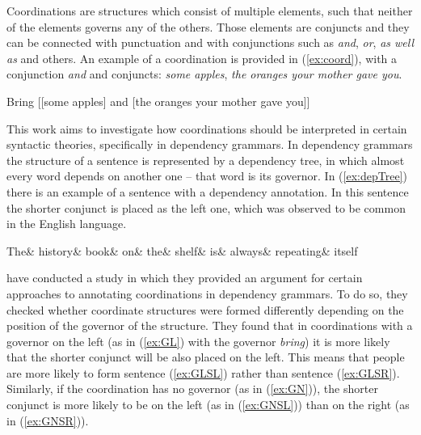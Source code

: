 Coordinations are structures which consist of multiple elements, such that neither of the elements governs any of the others. Those elements are conjuncts and they can be connected with punctuation and with conjunctions such as \textsl{and}, \textsl{or}, \textsl{as well as} and others. An example of a coordination is provided in (\ref{ex:coord}), with a conjunction \textsl{and} and conjuncts: \textsl{some apples}, \textsl{the oranges your mother gave you}.

\begin{exe}
    \ex\label{ex:coord}
    Bring [[some apples] and [the oranges your mother gave you]]
\end{exe}

This work aims to investigate how coordinations should be interpreted in certain syntactic theories, specifically in dependency grammars. In dependency grammars the structure of a sentence is represented by a dependency tree, in which almost every word depends on another one -- that word is its governor. In (\ref{ex:depTree}) there is an example of a sentence with a dependency annotation. In this sentence the shorter conjunct is placed as the left one, which was observed to be common in the English language.

\begin{exe}
	\ex\label{ex:depTree}
	\begin{dependency}[baseline=-\the\dimexpr\fontdimen22\textfont2\relax]
	\begin{deptext}
	The\& history\& book\& on\& the\& shelf\& is\& always\& repeating\& itself\\ 
	\end{deptext}
	\end{dependency}
\end{exe}

\cite{prz:woz:23} have conducted a study in which they provided an argument for certain approaches to annotating coordinations in dependency grammars. To do so, they checked whether coordinate structures were formed differently depending on the position of the governor of the structure. They found that in coordinations with a governor on the left (as in (\ref{ex:GL}) with the governor \textsl{bring}) it is more likely that the shorter conjunct will be also placed on the left. This means that people are more likely to form sentence (\ref{ex:GLSL}) rather than sentence (\ref{ex:GLSR}). Similarly, if the coordination has no governor (as in (\ref{ex:GN})), the shorter conjunct is more likely to be on the left (as in (\ref{ex:GNSL})) than on the right (as in (\ref{ex:GNSR})).

